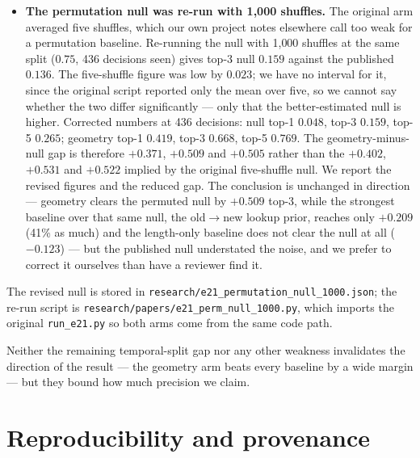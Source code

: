 \documentclass[11pt]{article}
\begin{document}
\begin{itemize}
  Caveat on what this split is: \texttt{refiling\_gate0.tsv} carries a
  sequence column but no timestamps, so we cannot confirm that the file
  order is the rater's adjudication order rather than the corpus order.
  This is a \emph{sequential} split and we do not claim it is
  chronological. It bounds the random split's optimism; it does not
  establish the true temporal curve.
\item \textbf{The permutation null was re-run with 1{,}000 shuffles.} The
original arm averaged five shuffles, which our own project notes elsewhere
call too weak for a permutation baseline. Re-running the null with
1{,}000 shuffles at the same split ($0.75$, 436 decisions seen) gives
top-3 null $0.159$ against the published $0.136$. The five-shuffle
figure was low by $0.023$; we have no interval for it, since the original
script reported only the mean over five, so we cannot say whether the
two differ significantly --- only that the better-estimated null is
higher. Corrected numbers at 436 decisions: null top-1 $0.048$, top-3
$0.159$, top-5 $0.265$; geometry top-1 $0.419$, top-3 $0.668$, top-5
$0.769$. The geometry-minus-null gap is therefore $+0.371$, $+0.509$ and
$+0.505$ rather than the $+0.402$, $+0.531$ and $+0.522$ implied by the
original five-shuffle null. We report the revised figures and the reduced
gap. The conclusion is
unchanged in direction --- geometry clears the permuted null by $+0.509$
top-3, while the strongest baseline over that same null, the
old$\rightarrow$new lookup prior, reaches only $+0.209$ (41\% as much) and
the length-only baseline does not clear the null at all ($-0.123$) --- but
the published null understated the noise, and we prefer to correct it
ourselves than have a reviewer find it.
\end{itemize}

The revised null is stored in
\texttt{research/e21\_permutation\_null\_1000.json}; the re-run script is
\texttt{research/papers/e21\_perm\_null\_1000.py}, which imports the
original \texttt{run\_e21.py} so both arms come from the same code path.

Neither the remaining temporal-split gap nor any other weakness invalidates
the direction of the result --- the geometry arm beats every baseline by a
wide margin --- but they bound how much precision we claim.

\section*{Reproducibility and provenance}
\end{document}
